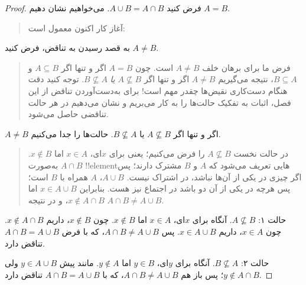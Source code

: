 \documentclass[../../../include/open-logic-section]{subfiles}
\begin{document}
\begin{proof}
  فرض کنید $A \cup B = A \cap B$. می‌خواهیم نشان دهیم $A = B$.
  \begin{quote}
    آغاز کار اکنون معمول است:
  \end{quote}
  به قصد رسیدن به تناقض، فرض کنید $A \neq B$.
  \begin{quote}
    فرض ما برای برهان خلف $A \neq B$ است. چون $A = B$ اگر و تنها اگر
    $A \subseteq B$ و $B \subseteq A$، نتیجه می‌گیریم $A \neq B$ اگر و
    تنها اگر $A \nsubseteq B$ \emph{یا} $B \nsubseteq A$. توجه کنید
    دقت هنگام دست‌کاری نقیض‌ها چقدر مهم است!{} برای به‌دست‌آوردن تناقض
    از این فصل، اثبات به تفکیک حالت‌ها را به کار می‌بریم و نشان می‌دهیم
    در هر حالت تناقضی حاصل می‌شود.
  \end{quote}
  $A \neq B$ اگر و تنها اگر $A \nsubseteq B$ یا $B \nsubseteq A$.
  حالت‌ها را جدا می‌کنیم.
  \begin{quote}
    در حالت نخست $A \nsubseteq B$ را فرض می‌کنیم؛ یعنی برای $x$ای،
    $x \in A$ اما $x \notin B$. $A \cap B$ به‌صورت !!{element}هایی
    تعریف می‌شود که $A$ و $B$ مشترک دارند؛ پس اگر چیزی در یکی از آن‌ها
    نباشد، در اشتراک نیست. $A \cup B$، $A$ همراه با $B$ است؛ پس هرچه در یکی از
    آن دو باشد در اجتماع نیز هست. بنابراین $x \in A \cup B$ اما
    $x \notin A \cap B$، و در نتیجه $A \cap B \neq A \cup B$.
  \end{quote}

  حالت ۱: $A \nsubseteq B$. آنگاه برای $x$ای، $x \in A$ اما
  $x \notin B$. چون $x \notin B$، داریم $x \notin A \cap B$. چون
  $x \in A$، داریم $x \in A \cup B$. پس
  $A \cap B \neq A \cup B$، که با فرض $A \cap B = A \cup B$ تناقض دارد.

  حالت ۲: $B \nsubseteq A$. آنگاه برای $y$ای، $y \in B$ اما
  $y \notin A$. مانند پیش $y \in A \cup B$ ولی
  $y \notin A \cap B$؛ پس باز هم $A \cap B \neq A \cup B$، که با
  $A \cap B = A \cup B$ تناقض دارد.
\end{proof}
\end{document}
